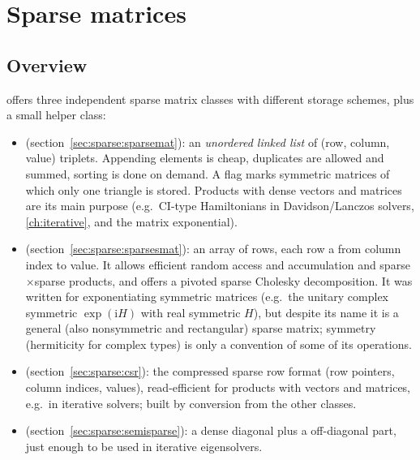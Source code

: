 \chapter{Sparse matrices}\label{ch:sparse}

\section{Overview}\label{sec:sparse:overview}
\LA{} offers three independent sparse matrix classes with different storage schemes, plus a small helper class:
\begin{itemize}
\item {} (section~\ref{sec:sparse:sparsemat}): an \emph{unordered linked list} of
  (row, column, value) triplets. Appending elements is cheap, duplicates are allowed and summed,
  sorting is done on demand. A flag marks symmetric matrices of which only one triangle is stored.
  Products with dense vectors and matrices are its main purpose (e.g.\ CI-type Hamiltonians in
  Davidson/Lanczos solvers, \ref{ch:iterative}, and the matrix exponential).
\item {} (section~\ref{sec:sparse:sparsesmat}): an array of rows, each row a
   from column index to value. It allows efficient random access and accumulation and
  sparse$\times$sparse products, and offers a pivoted sparse Cholesky decomposition. It was written for
  exponentiating symmetric matrices (e.g.\ the unitary complex symmetric $\exp(\mathrm{i}H)$ with real symmetric $H$),
  but despite its name it is a general (also nonsymmetric and rectangular) sparse matrix; symmetry
  (hermiticity for complex types) is only a convention of some of its operations.
\item {} (section~\ref{sec:sparse:csr}): the compressed sparse row format (row pointers, column
  indices, values), read-efficient for products with vectors and matrices, e.g.\ in iterative solvers; built by
  conversion from the other classes.
\item {} (section~\ref{sec:sparse:semisparse}): a dense diagonal plus a
   off-diagonal part, just enough to be used in iterative eigensolvers.
\end{itemize}

